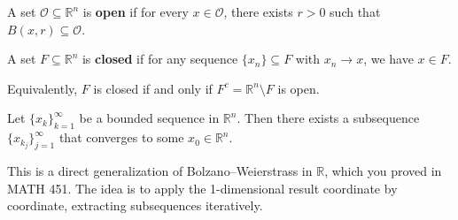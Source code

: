 \documentclass[11pt]{report}
\begin{document}
\begin{defbox}
A set $\mathcal{O} \subseteq \mathbb{R}^n$ is \textbf{open} if for every $x \in \mathcal{O}$, there exists $r > 0$ such that $B(x, r) \subseteq \mathcal{O}$.
\end{defbox}

\begin{defbox}
A set $F \subseteq \mathbb{R}^n$ is \textbf{closed} if for any sequence $\{x_n\} \subseteq F$ with $x_n \to x$, we have $x \in F$.

Equivalently, $F$ is closed if and only if $F^c = \mathbb{R}^n \setminus F$ is open.
\end{defbox}

\begin{thmbox}
Let $\{x_k\}_{k=1}^\infty$ be a bounded sequence in $\mathbb{R}^n$. Then there exists a subsequence $\{x_{k_j}\}_{j=1}^\infty$ that converges to some $x_0 \in \mathbb{R}^n$.
\end{thmbox}

\begin{rembox}
This is a direct generalization of Bolzano--Weierstrass in $\mathbb{R}$, which you proved in MATH 451. The idea is to apply the 1-dimensional result coordinate by coordinate, extracting subsequences iteratively.
\end{rembox}
\end{document}
